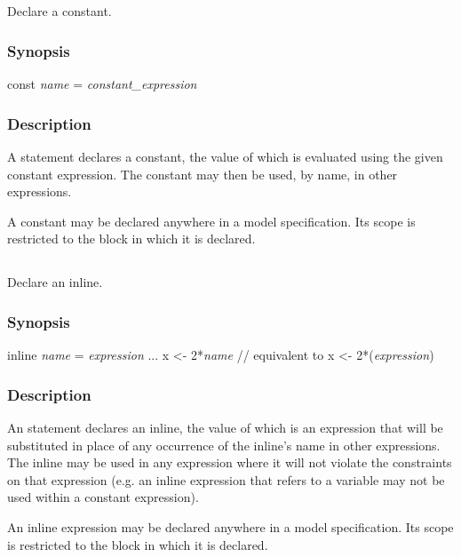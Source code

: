 \subsection{\label{const}}

Declare a constant.

\subsubsection*{Synopsis\label{const_Synopsis}}
\begin{bicode}
const \textsl{name} = \textsl{constant_expression}
\end{bicode}

\subsubsection*{Description\label{const_description}}

A  statement declares a constant, the
value of which is evaluated using the given constant
expression. The constant may then be used, by
name, in other expressions.

A constant may be declared anywhere in a model
specification. Its scope is restricted to the block in which it is
declared.

\subsection{\label{inline}}

Declare an inline.

\subsubsection*{Synopsis\label{inline_synopsis}}
\begin{bicode}
inline \textsl{name} = \textsl{expression}
...
x <- 2*\textsl{name}  // equivalent to x <- 2*(\textsl{expression})
\end{bicode}

\subsubsection*{Description\label{inline_description}}

An  statement declares an inline, the value of which is an expression that will be substituted in
place of any occurrence of the inline's name in other expressions. The inline
may be used in any expression where it will not violate the constraints on
that expression (e.g. an inline expression that refers to a 
variable may not be used within a constant expression).

An inline expression may be declared anywhere in a
model specification. Its scope is restricted to the block in which it is
declared.
